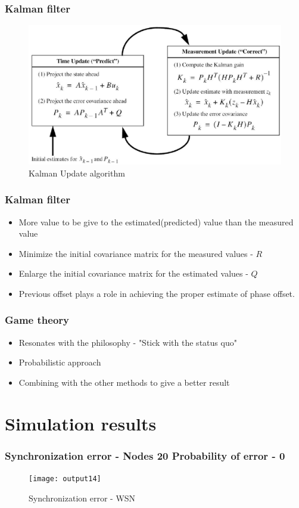 \documentclass[t]{beamer}
\begin{document}
\begin{frame}
\frametitle{Kalman filter}
\begin{figure}
\centering
\includegraphics[width=0.8 \textwidth]{kalman_update}
\caption{Kalman Update algorithm}
\end{figure}
\end{frame}
\begin{frame}
\frametitle{Kalman filter}
\begin{itemize}
\item More value to be give to the estimated(predicted) value than the measured
value \newline
\item Minimize the initial covariance matrix for the measured values
- $R$ \newline
\item Enlarge the initial covariance matrix for the estimated
values - $Q$ \newline
\item Previous offset plays a
role in achieving the proper estimate of phase offset.
\end{itemize}
\end{frame}
\begin{frame}
 \frametitle{Game theory}
 \begin{itemize}
\item Resonates with the philosophy - "Stick with the status quo"
\newline
\item Probabilistic approach \newline
\item Combining with the other methods to give a better result
\end{itemize}
\end{frame}

\section{Simulation results}
\begin{frame}
    \frametitle{Synchronization error - Nodes 20 Probability of error - 0}
    \begin{figure}
    \centering
    \texttt{[image: output14]}
    \caption{Synchronization error - WSN}
    \end{figure}
\end{frame}
\end{document}
